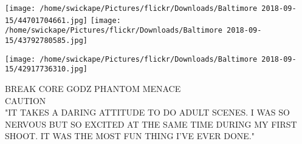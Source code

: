 \documentclass[10pt,letterpaper]{article}
\begin{document}
\texttt{[image: /home/swickape/Pictures/flickr/Downloads/Baltimore 2018-09-15/44701704661.jpg]}
\texttt{[image: /home/swickape/Pictures/flickr/Downloads/Baltimore 2018-09-15/43792780585.jpg]}

\texttt{[image: /home/swickape/Pictures/flickr/Downloads/Baltimore 2018-09-15/42917736310.jpg]}

BREAK CORE GODZ PHANTOM MENACE\\
CAUTION\\
"IT TAKES A DARING ATTITUDE TO DO ADULT SCENES.  I WAS SO NERVOUS BUT SO EXCITED AT THE SAME TIME DURING MY FIRST SHOOT.  IT WAS THE MOST FUN THING I'VE EVER DONE."
\pagebreak
\end{document}
